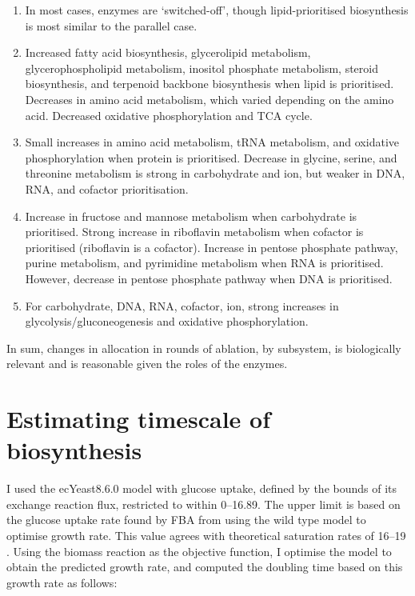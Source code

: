 \begin{enumerate}
  \item In most cases, enzymes are `switched-off', though lipid-prioritised biosynthesis is most similar to the parallel case.
  \item Increased fatty acid biosynthesis, glycerolipid metabolism, glycerophospholipid metabolism, inositol phosphate metabolism, steroid biosynthesis, and terpenoid backbone biosynthesis when lipid is prioritised.
        Decreases in amino acid metabolism, which varied depending on the amino acid.
        Decreased oxidative phosphorylation and TCA cycle.
  \item Small increases in amino acid metabolism, tRNA metabolism, and oxidative phosphorylation when protein is prioritised.
        Decrease in glycine, serine, and threonine metabolism is strong in carbohydrate and ion, but weaker in DNA, RNA, and cofactor prioritisation.
  \item Increase in fructose and mannose metabolism when carbohydrate is prioritised.
        Strong increase in riboflavin metabolism when cofactor is prioritised (riboflavin is a cofactor).
        Increase in pentose phosphate pathway, purine metabolism, and pyrimidine metabolism when RNA is prioritised.
        However, decrease in pentose phosphate pathway when DNA is prioritised.
  \item For carbohydrate, DNA, RNA, cofactor, ion, strong increases in glycolysis/glu\-co\-neo\-ge\-ne\-sis and oxidative phosphorylation.
\end{enumerate}

In sum, changes in allocation in rounds of ablation, by subsystem, is biologically relevant and is reasonable given the roles of the enzymes.


\section{Estimating timescale of biosynthesis}
\label{sec:model-timescale}

I used the ecYeast8.6.0 model with glucose uptake, defined by the bounds of its exchange reaction flux, restricted to within \SIrange{0}{16.89}{\mmolgdw}.
The upper limit is based on the glucose uptake rate found by FBA from using the wild type model to optimise growth rate.
This value agrees with theoretical saturation rates of \SIrange{16}{19}{\mmolgdw} \parencite{blankTCACycleActivity2004}.
Using the biomass reaction as the objective function, I optimise the model to obtain the predicted growth rate, and computed the doubling time based on this growth rate as follows:

